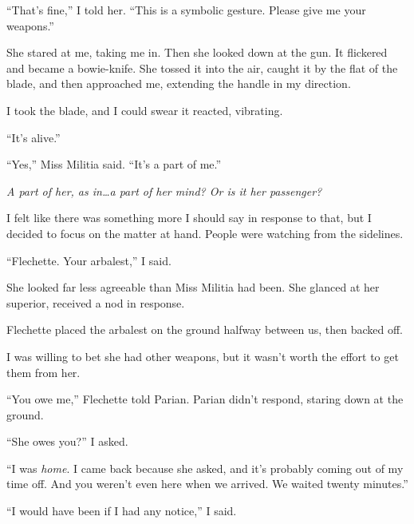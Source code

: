 ``That's fine,'' I told her.  ``This is a symbolic gesture.  Please give me your weapons.''



She stared at me, taking me in.  Then she looked down at the gun.  It flickered and became a bowie-knife.  She tossed it into the air, caught it by the flat of the blade, and then approached me, extending the handle in my direction.



I took the blade, and I could swear it reacted, vibrating.



``It's alive.''



``Yes,'' Miss Militia said.  ``It's a part of me.''



\emph{A part of her, as in\ldots a part of her mind? Or is it her passenger?}



I felt like there was something more I should say in response to that, but I decided to focus on the matter at hand. People were watching from the sidelines.



``Flechette.  Your arbalest,'' I said.



She looked far less agreeable than Miss Militia had been.  She glanced at her superior, received a nod in response.



Flechette placed the arbalest on the ground halfway between us, then backed off.



I was willing to bet she had other weapons, but it wasn't worth the effort to get them from her.



``You owe me,'' Flechette told Parian.  Parian didn't respond, staring down at the ground.



``She owes you?'' I asked.



``I was \emph{home}.  I came back because she asked, and it's probably coming out of my time off.  And you weren't even here when we arrived.  We waited twenty minutes.''



``I would have been if I had any notice,'' I said.



